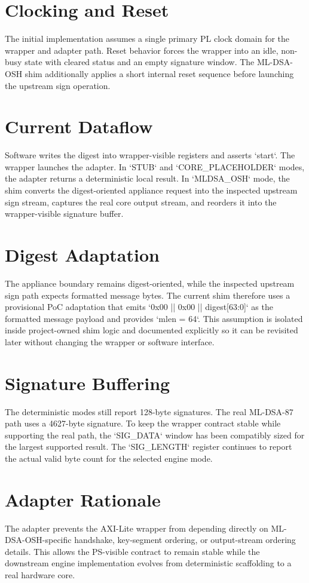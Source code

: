 \section{Clocking and Reset}
The initial implementation assumes a single primary PL clock domain for the wrapper and adapter path. Reset behavior forces the wrapper into an idle, non-busy state with cleared status and an empty signature window. The ML-DSA-OSH shim additionally applies a short internal reset sequence before launching the upstream sign operation.

\section{Current Dataflow}
Software writes the digest into wrapper-visible registers and asserts `start`. The wrapper launches the adapter. In `STUB` and `CORE\_PLACEHOLDER` modes, the adapter returns a deterministic local result. In `MLDSA\_OSH` mode, the shim converts the digest-oriented appliance request into the inspected upstream sign stream, captures the real core output stream, and reorders it into the wrapper-visible signature buffer.

\section{Digest Adaptation}
The appliance boundary remains digest-oriented, while the inspected upstream sign path expects formatted message bytes. The current shim therefore uses a provisional PoC adaptation that emits `0x00 || 0x00 || digest[63:0]` as the formatted message payload and provides `mlen = 64`. This assumption is isolated inside project-owned shim logic and documented explicitly so it can be revisited later without changing the wrapper or software interface.

\section{Signature Buffering}
The deterministic modes still report 128-byte signatures. The real ML-DSA-87 path uses a 4627-byte signature. To keep the wrapper contract stable while supporting the real path, the `SIG\_DATA` window has been compatibly sized for the largest supported result. The `SIG\_LENGTH` register continues to report the actual valid byte count for the selected engine mode.

\section{Adapter Rationale}
The adapter prevents the AXI-Lite wrapper from depending directly on ML-DSA-OSH-specific handshake, key-segment ordering, or output-stream ordering details. This allows the PS-visible contract to remain stable while the downstream engine implementation evolves from deterministic scaffolding to a real hardware core.

